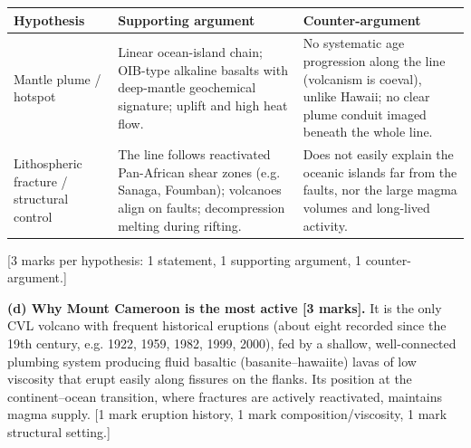 \documentclass[11pt]{article}
\begin{document}
\begin{corrige}
\begin{center}
\begin{tabularx}{\linewidth}{|l|X|X|}
\hline
\rowcolor{popblueL} \textbf{Hypothesis} & \textbf{Supporting argument} & \textbf{Counter-argument} \\
\hline
Mantle plume / hotspot & Linear ocean-island chain; OIB-type alkaline basalts with deep-mantle geochemical signature; uplift and high heat flow. & No systematic age progression along the line (volcanism is coeval), unlike Hawaii; no clear plume conduit imaged beneath the whole line. \\
\hline
Lithospheric fracture / structural control & The line follows reactivated Pan-African shear zones (e.g. Sanaga, Foumban); volcanoes align on faults; decompression melting during rifting. & Does not easily explain the oceanic islands far from the faults, nor the large magma volumes and long-lived activity. \\
\hline
\end{tabularx}
\end{center}

[3 marks per hypothesis: 1 statement, 1 supporting argument, 1 counter-argument.]

\textbf{(d) Why Mount Cameroon is the most active [3 marks].} It is the only CVL volcano with frequent historical eruptions (about eight recorded since the 19th century, e.g. 1922, 1959, 1982, 1999, 2000), fed by a shallow, well-connected plumbing system producing fluid basaltic (basanite–hawaiite) lavas of low viscosity that erupt easily along fissures on the flanks. Its position at the continent–ocean transition, where fractures are actively reactivated, maintains magma supply. [1 mark eruption history, 1 mark composition/viscosity, 1 mark structural setting.]
\end{corrige}
\end{document}
